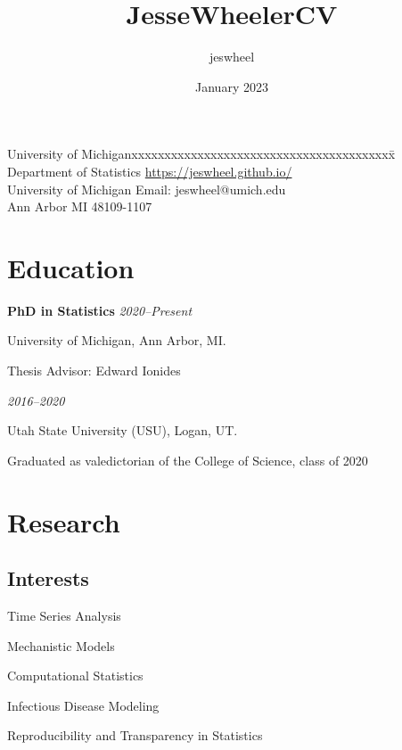 \documentclass[11pt]{article}
\title{JesseWheelerCV}
\author{jeswheel }
\date{January 2023}
\newenvironment {interests}
                {
                 \begin{list}{}
                 {\setlength{\labelwidth}{0mm}
                  \setlength{\leftmargin}{8mm}
                  \setlength{\itemindent}{-3mm}
                  \setlength{\labelsep}{0mm}
                  \setlength{\parsep}{0.1 ex}
                  \setlength{\itemsep}{1pt}
      \setlength{\topsep}{0.15cm}}} %
   {\end{list}}
\begin{document}
\thispagestyle{empty}  %

\rule{0mm}{1mm}
\vspace{-20mm}


\vspace{1mm}

\rule{0mm}{1mm}


\begin{tabbing}
University of Michiganxxxxxxxxxxxxxxxxxxxxxxxxxxxxxxxxxxxxxxxx\= \kill
Department of Statistics \>  %
{\url{https://jeswheel.github.io/}}
\\
University of Michigan\> %
Email: {jeswheel@umich.edu}
\\
Ann Arbor MI 48109-1107 \>
\end{tabbing}

\section*{Education}

{\bf PhD in Statistics} \hfill {\textit{2020--Present}}

University of Michigan, Ann Arbor, MI.

Thesis Advisor: Edward Ionides

 \hfill  {\textit{2016--2020}}

Utah State University (USU), Logan, UT.

Graduated as valedictorian of the College of Science, class of 2020

\section*{Research}
\subsection*{Interests}
\begin{interests}
    \item Time Series Analysis
    \item Mechanistic Models
    \item Computational Statistics
    \item Infectious Disease Modeling
    \item Reproducibility and Transparency in Statistics

\end{interests}
\end{document}
